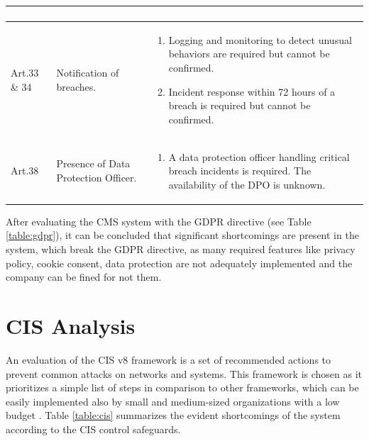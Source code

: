 \begin{longtable}{ |p{3cm}|p{5cm}| p{7cm} |}
\begin{enumerate}
\end{enumerate}\\
\hline
Art.33 \& 34 & Notification of breaches.  &  
\vspace{-\baselineskip}
\begin{enumerate}
    \item Logging and monitoring to detect unusual behaviors are required but cannot be confirmed.
    \item Incident response within 72 hours of a breach is required but cannot be confirmed.
\end{enumerate}\\
\hline
Art.38 & Presence of Data Protection Officer.  &  
\vspace{-\baselineskip}
\begin{enumerate}
    \item A data protection officer handling critical breach incidents is required. The availability of the DPO is unknown.
\end{enumerate}\\
\hline
\end{longtable}
\endgroup
After evaluating the CMS system with the GDPR directive (see Table \ref{table:gdpr}), it can be concluded that significant shortcomings are present in the system, which break the GDPR directive, as many required features like privacy policy, cookie consent, data protection are not adequately implemented and the company can be fined for not them.

\section{CIS Analysis}
An evaluation of the CIS v8 framework is a set of recommended actions to prevent common attacks on networks and systems. This framework is chosen as it prioritizes a simple list of steps in comparison to other frameworks, which can be easily implemented also by small and medium-sized organizations with a low budget \citep[p.~59]{CIS}. Table \ref{table:cis} summarizes the evident shortcomings of the system according to the CIS control safeguards.

